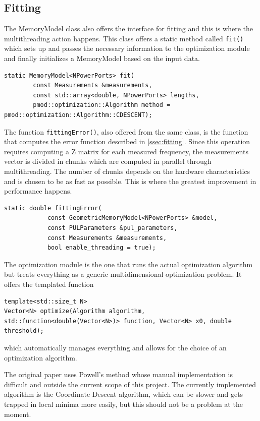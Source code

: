 \subsection{Fitting}
The MemoryModel class also offers the interface for fitting and this is where the multithreading action happens. This class offers a static method called \texttt{fit()} which sets up and passes the necessary information to the optimization module and finally initializes a MemoryModel based on the input data.
\begin{lstlisting}
static MemoryModel<NPowerPorts> fit(
        const Measurements &measurements,
        const std::array<double, NPowerPorts> lengths,
        pmod::optimization::Algorithm method = pmod::optimization::Algorithm::CDESCENT);
\end{lstlisting}
The function \texttt{fittingError()}, also offered from the same class, is the function that computes the error function described in \autoref{ssec:fitting}. Since this operation requires computing a Z matrix for each measured frequency, the measurements vector is divided in chunks which are computed in parallel through multithreading. The number of chunks depends on the hardware characteristics and is chosen to be as fast as possible. This is where the greatest improvement in performance happens.
\begin{lstlisting}
static double fittingError(
            const GeometricMemoryModel<NPowerPorts> &model,
            const PULParameters &pul_parameters,
            const Measurements &measurements,
            bool enable_threading = true);
\end{lstlisting}

The optimization module is the one that runs the actual optimization algorithm but treats everything as a generic multidimensional optimization problem. It offers the templated function
\begin{lstlisting}
template<std::size_t N>
Vector<N> optimize(Algorithm algorithm, std::function<double(Vector<N>)> function, Vector<N> x0, double threshold);
\end{lstlisting}
which automatically manages everything and allows for the choice of an optimization algorithm.

The original paper uses Powell's method whose manual implementation is difficult and outside the current scope of this project. The currently implemented algorithm is the Coordinate Descent algorithm, which can be slower and gets trapped in local minima more easily, but this should not be a problem at the moment.

